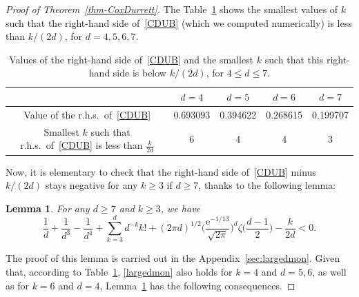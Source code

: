 \documentclass[oneside]{amsart}
\newcommand{\e}{\mathrm e}
\newtheorem{lemma}[theorem]{Lemma}
\theoremstyle{definition}
\newcommand{\1}{\mathbbm{1}}
\newcommand{\0}{\mathbf{o}}
\newcommand{\basc}[1]{{\color{blue}{ \bf [~Bas:\ }\emph{#1}\textbf{~]}}}
\numberwithin{equation}{section}
\begin{document}
\begin{proof}[Proof of Theorem~\ref{thm-CoxDurrett}]

The Table~\ref{table-CD} shows the smallest values of $k$ such that the right-hand side of~\eqref{CDUB} (which we computed numerically) is less than $k/(2d)$, for $d=4,5,6,7$.
\begin{table}
\begin{center}
    \begin{tabular}{|c|c|c|c|c|} \hline
       &  $d=4$ & $d=5$ & $d=6$ & $d=7$ \\ \hline
        Value of the r.h.s.\ of~\eqref{CDUB}   & 0.693093  & 0.394622  & 0.268615 & 0.199707  \\ \hline
         Smallest $k$ such that r.h.s.\ of~\eqref{CDUB} is less than $\tfrac{k}{2d} $ & 6 & 4 & 4 & 3 \\ \hline 
    \end{tabular}
\end{center}
\caption{Values of the right-hand side of~\eqref{CDUB} and the smallest $k$ such that this right-hand side is below $k/(2d) $, for $4 \leq d \leq 7$.}\label{table-CD}
\end{table}
Now, it is elementary to check that the right-hand side of~\eqref{CDUB} minus $k/(2d)$ stays negative for any $k \geq 3$ if $d \geq 7$, thanks to the following lemma:
\begin{lemma}\label{lemma-largedmon}
For any $d \geq 7$ and $k \geq 3$, we have
\begin{equation}\label{largedmon} \frac{1}{d} + \frac{1}{d^3} -\frac{1}{d^4} + \sum_{k=3}^d d^{-k} k! +  (2\pi d)^{1/2} \Big( \frac{\e^{-1/13}}{\sqrt{2\pi}} \Big)^d \zeta\Big( \frac{d-1}{2} \Big) - \frac{k}{2d} < 0.  \end{equation}
\end{lemma}
The proof of this lemma is carried out in the Appendix~\ref{sec:largedmon}. Given that, according to Table~\ref{table-CD}, \eqref{largedmon} also holds for $k=4$ and $d=5,6$, as well as for $k=6$ and $d=4$, Lemma~\ref{lemma-largedmon} has the following consequences.  %

\end{proof}
\end{document}

